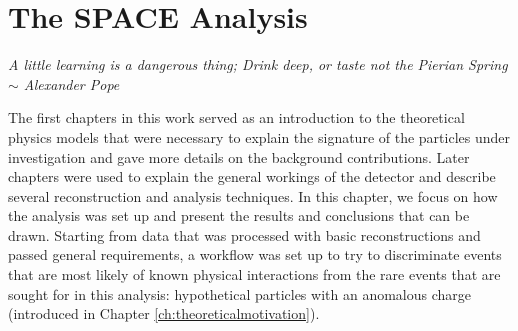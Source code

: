 \chapter{The SPACE Analysis}
\label{ch:space}
\begin{flushright}
\textit{A little learning is a dangerous thing; Drink deep, or taste not the Pierian Spring \\$\sim$ Alexander Pope}
\end{flushright}

\noindent The first chapters in this work served as an introduction to the theoretical physics models that were necessary to explain the signature of the particles under investigation and gave more details on the background contributions. Later chapters were used to explain the general workings of the detector and describe several reconstruction and analysis techniques. In this chapter, we focus on how the analysis was set up and present the results and conclusions that can be drawn. Starting from data that was processed with basic reconstructions and passed general requirements, a workflow was set up to try to discriminate events that are most likely of known physical interactions from the rare events that are sought for in this analysis: hypothetical particles with an anomalous charge (introduced in Chapter \ref{ch:theoreticalmotivation}). 

